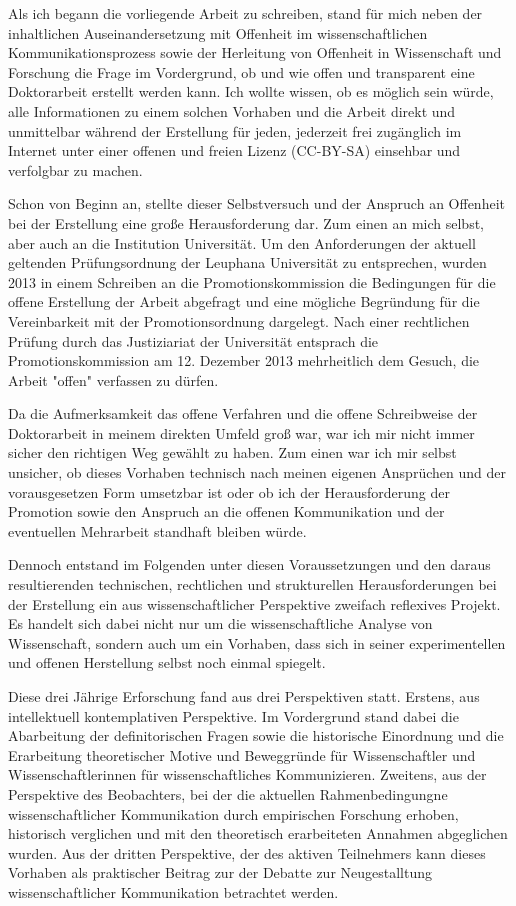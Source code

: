 Als ich begann die vorliegende Arbeit zu schreiben, stand für mich neben der inhaltlichen Auseinandersetzung mit Offenheit im wissenschaftlichen Kommunikationsprozess sowie der Herleitung von Offenheit in Wissenschaft und Forschung die Frage im Vordergrund, ob und wie offen und transparent eine Doktorarbeit erstellt werden kann. Ich wollte wissen, ob es möglich sein würde, alle Informationen zu einem solchen Vorhaben und die Arbeit direkt und unmittelbar während der Erstellung für jeden, jederzeit frei zugänglich im Internet unter einer offenen und freien Lizenz (CC-BY-SA) einsehbar und verfolgbar zu machen.

Schon von Beginn an, stellte dieser Selbstversuch und der Anspruch an Offenheit bei der Erstellung eine große Herausforderung dar. Zum einen an mich selbst, aber auch an die Institution Universität. Um den Anforderungen der aktuell geltenden Prüfungsordnung der Leuphana Universität zu entsprechen, wurden 2013 in einem Schreiben an die Promotionskommission die Bedingungen für die offene Erstellung der Arbeit abgefragt und eine mögliche Begründung für die Vereinbarkeit mit der Promotionsordnung dargelegt. Nach einer rechtlichen Prüfung durch das Justiziariat der Universität entsprach die Promotionskommission am 12. Dezember 2013 mehrheitlich dem Gesuch, die Arbeit "offen" verfassen zu dürfen.

Da die Aufmerksamkeit das offene Verfahren und die offene Schreibweise der Doktorarbeit in meinem direkten Umfeld groß war, war ich mir nicht immer sicher den richtigen Weg gewählt zu haben. Zum einen war ich mir selbst unsicher, ob dieses Vorhaben technisch nach meinen eigenen Ansprüchen und der vorausgesetzen Form umsetzbar ist oder ob ich der Herausforderung der Promotion sowie den Anspruch an die offenen Kommunikation und der eventuellen Mehrarbeit standhaft bleiben würde.

Dennoch entstand im Folgenden unter diesen Voraussetzungen und den daraus resultierenden technischen, rechtlichen und strukturellen Herausforderungen bei der Erstellung ein aus wissenschaftlicher Perspektive zweifach reflexives Projekt. Es handelt sich dabei nicht nur um die wissenschaftliche Analyse von Wissenschaft, sondern auch um ein Vorhaben, dass sich in seiner experimentellen und offenen Herstellung selbst noch einmal spiegelt.

Diese drei Jährige Erforschung fand aus drei Perspektiven statt. Erstens, aus intellektuell kontemplativen Perspektive. Im Vordergrund stand dabei die Abarbeitung der definitorischen Fragen sowie die historische Einordnung und die Erarbeitung theoretischer Motive und Beweggründe für Wissenschaftler und Wissenschaftlerinnen für wissenschaftliches Kommunizieren. Zweitens, aus der Perspektive des Beobachters, bei der die aktuellen Rahmenbedingungne wissenschaftlicher Kommunikation durch empirischen Forschung erhoben, historisch verglichen und mit den theoretisch erarbeiteten Annahmen abgeglichen wurden. Aus der dritten Perspektive, der des aktiven Teilnehmers kann dieses Vorhaben als praktischer Beitrag zur der Debatte zur Neugestalltung wissenschaftlicher Kommunikation betrachtet werden.

